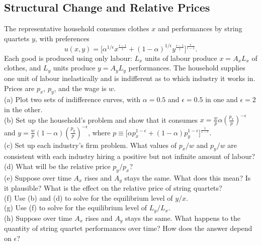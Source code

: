 \documentclass[12pt, letterpaper]{article}
\begin{document}
\subsection{Structural Change and Relative Prices}

\begin{tcolorbox}[oddbox,title={Problem 9.3 \quad Baumol's Cost Disease}]
\begin{tcolorbox}[questionbox]
The representative household consumes clothes $x$ and performances by string quartets $y$, with
preferences
\[
u(x,y)=\Big[\alpha^{1/\epsilon}x^{\frac{\epsilon-1}{\epsilon}}
+(1-\alpha)^{1/\epsilon}y^{\frac{\epsilon-1}{\epsilon}}\Big]^{\frac{\epsilon}{\epsilon-1}} .
\]
Each good is produced using only labour: $L_x$ units of labour produce $x=A_xL_x$ of clothes,
and $L_y$ units produce $y=A_yL_y$ performances. The household supplies one unit of labour
inelastically and is indifferent as to which industry it works in. Prices are $p_x$, $p_y$, and
the wage is $w$.\\[3pt]
(a) Plot two sets of indifference curves, with $\alpha=0.5$ and $\epsilon=0.5$ in one and
$\epsilon=2$ in the other.\\
(b) Set up the household's problem and show that it consumes
$x=\frac{w}{p}\alpha\left(\frac{p_x}{p}\right)^{-\epsilon}$ and
$y=\frac{w}{p}(1-\alpha)\left(\frac{p_y}{p}\right)^{-\epsilon}$, where
$p\equiv\big[\alpha p_x^{1-\epsilon}+(1-\alpha)p_y^{1-\epsilon}\big]^{\frac{1}{1-\epsilon}}$.\\
(c) Set up each industry's firm problem. What values of $p_x/w$ and $p_y/w$ are consistent with
each industry hiring a positive but not infinite amount of labour?\\
(d) What will be the relative price $p_y/p_x$?\\
(e) Suppose over time $A_x$ rises and $A_y$ stays the same. What does this mean? Is it
plausible? What is the effect on the relative price of string quartets?\\
(f) Use (b) and (d) to solve for the equilibrium level of $y/x$.\\
(g) Use (f) to solve for the equilibrium level of $L_y/L_x$.\\
(h) Suppose over time $A_x$ rises and $A_y$ stays the same. What happens to the quantity of
string quartet performances over time? How does the answer depend on $\epsilon$?
\end{tcolorbox}


\end{tcolorbox}
\end{document}

